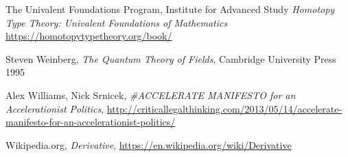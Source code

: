 \documentclass{article}
\begin{document}
\begin{thebibliography}{99}
 The Univalent Foundations Program,
Institute for Advanced Study \textit{Homotopy Type Theory:
Univalent Foundations of Mathematics} \url{https://homotopytypetheory.org/book/}

 Steven Weinberg, \textit{The Quantum Theory of Fields}, Cambridge University Press 1995

 Alex Williams, Nick Srnicek, \textit{\#ACCELERATE MANIFESTO for an Accelerationist Politics}, \url{http://criticallegalthinking.com/2013/05/14/accelerate-manifesto-for-an-accelerationist-politics/}



 Wikipedia.org, \textit{Derivative}, \url{https://en.wikipedia.org/wiki/Derivative}

\end{thebibliography}
\end{document}
